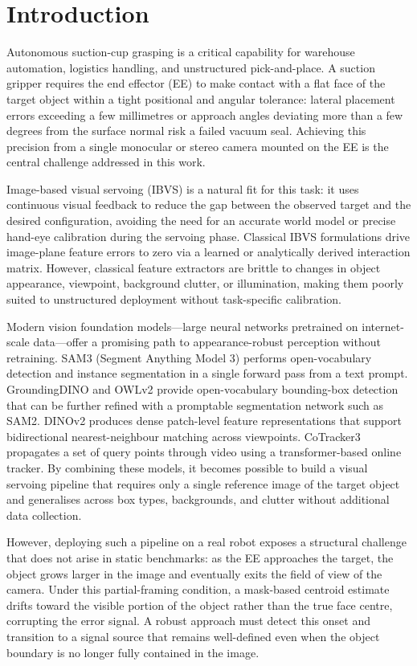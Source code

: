 \documentclass[lettersize,journal]{IEEEtran}
\begin{document}
\section{Introduction}
\label{sec:intro}

Autonomous suction-cup grasping is a critical capability for warehouse
automation, logistics handling, and unstructured pick-and-place.  A suction
gripper requires the end effector (EE) to make contact with a flat face of
the target object within a tight positional and angular tolerance: lateral
placement errors exceeding a few millimetres or approach angles deviating
more than a few degrees from the surface normal risk a failed vacuum seal.
Achieving this precision from a single monocular or stereo camera mounted
on the EE is the central challenge addressed in this work.

Image-based visual servoing (IBVS) is a natural fit for this task: it uses
continuous visual feedback to reduce the gap between the observed target
and the desired configuration, avoiding the need for an accurate world model
or precise hand-eye calibration during the servoing phase.  Classical IBVS
formulations drive image-plane feature errors to zero via a learned or
analytically derived interaction matrix.  However, classical feature
extractors are brittle to changes in object appearance, viewpoint, background
clutter, or illumination, making them poorly suited to unstructured deployment
without task-specific calibration.

Modern vision foundation models---large neural networks pretrained on
internet-scale data---offer a promising path to appearance-robust perception
without retraining.  SAM3 (Segment Anything Model 3) performs open-vocabulary
detection and instance segmentation in a single forward pass from a text
prompt.  GroundingDINO and OWLv2 provide open-vocabulary bounding-box
detection that can be further refined with a promptable segmentation network
such as SAM2.  DINOv2 produces dense patch-level feature representations
that support bidirectional nearest-neighbour matching across viewpoints.
CoTracker3 propagates a set of query points through video using a
transformer-based online tracker.  By combining these models, it becomes
possible to build a visual servoing pipeline that requires only a single
reference image of the target object and generalises across box types,
backgrounds, and clutter without additional data collection.

However, deploying such a pipeline on a real robot exposes a structural
challenge that does not arise in static benchmarks: as the EE approaches the
target, the object grows larger in the image and eventually exits the field
of view of the camera.  Under this partial-framing condition, a mask-based
centroid estimate drifts toward the visible portion of the object rather than
the true face centre, corrupting the error signal.  A robust approach must
detect this onset and transition to a signal source that remains well-defined
even when the object boundary is no longer fully contained in the image.
\end{document}

